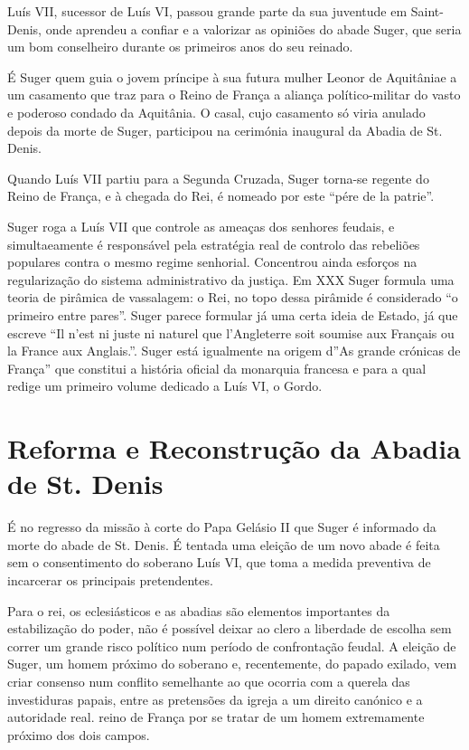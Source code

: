 \documentclass{article}
\begin{document}
Luís VII, sucessor de Luís VI, passou grande parte da sua juventude em
Saint-Denis, onde aprendeu a confiar e a valorizar as opiniões do
abade Suger, que seria um bom conselheiro durante os primeiros anos do
seu reinado.

É Suger quem guia o jovem príncipe à sua futura mulher Leonor de
Aquitâniae a um casamento que traz para o Reino de França a aliança
político-militar do vasto e poderoso condado da Aquitânia. O casal,
cujo casamento só viria anulado depois da morte de Suger, participou
na cerimónia inaugural da Abadia de St. Denis.

Quando Luís VII partiu para a Segunda Cruzada, Suger torna-se regente
do Reino de França, e à chegada do Rei, é nomeado por este ``pére de
la patrie''.

Suger roga a Luís VII que controle as ameaças dos senhores feudais, e
simultaeamente é responsável pela estratégia real de controlo das
rebeliões populares contra o mesmo regime senhorial. Concentrou ainda
esforços na regularização do sistema administrativo da justiça. Em XXX
Suger formula uma teoria de pirâmica de vassalagem: o Rei, no topo
dessa pirâmide é considerado ``o primeiro entre pares''. Suger parece
formular já uma certa ideia de Estado, já que escreve ``Il n’est ni
juste ni naturel que l’Angleterre soit soumise aux Français ou la
France aux Anglais.''. Suger está igualmente na origem d''As grande
crónicas de França'' que constitui a história oficial da monarquia
francesa e para a qual redige um primeiro volume dedicado a Luís VI, o
Gordo.

\section{Reforma e Reconstrução da Abadia de St. Denis}

É no regresso da missão à corte do Papa Gelásio II que Suger é
informado da morte do abade de St. Denis. É tentada uma eleição de um
novo abade é feita sem o consentimento do soberano Luís VI, que toma a
medida preventiva de incarcerar os principais pretendentes.

Para o rei, os eclesiásticos e as abadias são elementos importantes da
estabilização do poder, não é possível deixar ao clero a liberdade de
escolha sem correr um grande risco político num período de
confrontação feudal. A eleição de Suger, um homem próximo do soberano
e, recentemente, do papado exilado, vem criar consenso num conflito
semelhante ao que ocorria com a querela das investiduras papais, entre
as pretensões da igreja a um direito canónico e a autoridade real.
reino de França por se tratar de um homem extremamente próximo dos
dois campos.
\end{document}
